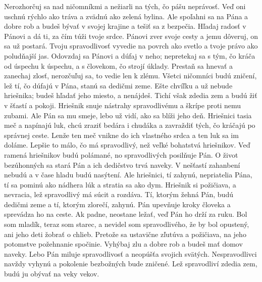 Nerozhorčuj sa nad ničomníkmi
a nežiarli na tých, čo pášu neprávosť.
\versseparator
Veď oni uschnú rýchlo ako tráva
a zvädnú ako zelená bylina.
\versseparator
Ale spoľahni sa na Pána a dobre rob
a budeš bývať v svojej krajine a tešiť sa z bezpečia.
\versseparator
Hľadaj radosť v Pánovi
a dá ti, za čím túži tvoje srdce.
\versseparator
Pánovi zver svoje cesty a jemu dôveruj,
on sa už postará.
\versseparator
Tvoju spravodlivosť vyvedie na povrch ako svetlo
a tvoje právo ako poludňajší jas.
Odovzdaj sa Pánovi a dúfaj v neho;
\versseparator
nepretekaj sa s tým, čo kráča od úspechu k úspechu,
a s človekom, čo strojí úklady.
\versseparator
Prestaň sa hnevať a zanechaj zlosť,
nerozčuľuj sa, to vedie len k zlému.
\versseparator
Všetci ničomníci budú zničení,
lež tí, čo dúfajú v Pána, stanú sa dedičmi zeme.
\versseparator
Ešte chvíľku a už nebude hriešnika;
budeš hľadať jeho miesto, a nenájdeš.
\versseparator
Tichí však zdedia zem
a budú žiť v šťastí a pokoji.
\versseparator
Hriešnik snuje nástrahy spravodlivému
a škrípe proti nemu zubami.
\versseparator
Ale Pán sa mu smeje,
lebo už vidí, ako sa blíži jeho deň.
\versseparator
Hriešnici tasia meč
a napínajú luk,
\versseparator
chcú zraziť bedára i chudáka
a zavraždiť tých, čo kráčajú po správnej ceste.
\versseparator
Lenže ten meč vnikne do ich vlastného srdca
a ten luk sa im doláme.
\versseparator
Lepšie to málo, čo má spravodlivý,
než veľké bohatstvá hriešnikov.
\versseparator
Veď ramená hriešnikov budú polámané,
no spravodlivých posilňuje Pán.
\versseparator
O život bezúhonných sa stará Pán
a ich dedičstvo trvá naveky.
\versseparator
V nešťastí zahanbení nebudú
a v čase hladu budú nasýtení.
Ale hriešnici, tí zahynú,
\versseparator
nepriatelia Pána, tí sa pominú ako nádhera lúk
a stratia sa ako dym.
\versseparator
Hriešnik si požičiava, a nevracia,
lež spravodlivý má súcit a rozdáva.
\versseparator
Tí, ktorým žehná Pán, budú dedičmi zeme
a tí, ktorým zlorečí, zahynú.
\versseparator
Pán upevňuje kroky človeka
a sprevádza ho na ceste.
\versseparator
Ak padne, neostane ležať,
veď Pán ho drží za ruku.
\versseparator
Bol som mladík, teraz som starec,
a nevidel som spravodlivého, že by bol opustený,
ani jeho deti žobrať o chlieb.
\versseparator
Pretože sa ustavične zľutúva a požičiava,
na jeho potomstve požehnanie spočinie.
\versseparator
Vyhýbaj zlu a dobre rob
a budeš mať domov naveky.
\versseparator
Lebo Pán miluje spravodlivosť
a neopúšťa svojich svätých.
\versseparator
Nespravodlivci navždy vyhynú
a pokolenie bezbožných bude zničené.
\versseparator
Lež spravodliví zdedia zem,
budú ju obývať na veky vekov.
